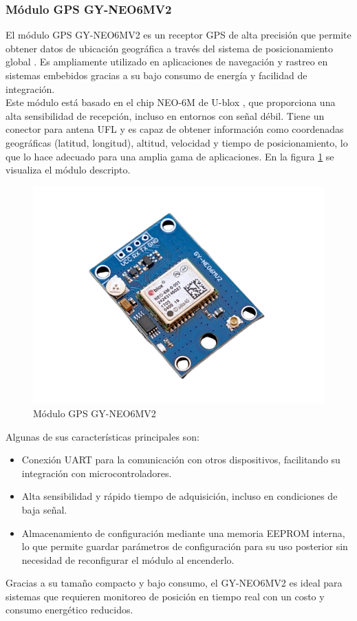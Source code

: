 \subsubsection{Módulo GPS GY-NEO6MV2}

El módulo GPS GY-NEO6MV2 es un receptor GPS de alta precisión que permite obtener datos de ubicación geográfica a través del sistema de posicionamiento global \cite{gy-neo6}. Es ampliamente utilizado en aplicaciones de navegación y rastreo en sistemas embebidos gracias a su bajo consumo de energía y facilidad de integración.\\

Este módulo está basado en el chip NEO-6M de U-blox \cite{neo6}, que proporciona una alta sensibilidad de recepción, incluso en entornos con señal débil. Tiene un conector para antena UFL y es capaz de obtener información como coordenadas geográficas (latitud, longitud), altitud, velocidad y tiempo de posicionamiento, lo que lo hace adecuado para una amplia gama de aplicaciones. En la figura \ref{fig:gps_module} se visualiza el módulo descripto. \\


\begin{figure}[H]
    \centering
    \includegraphics[scale = 0.6]{img/gps_module.png}
    \caption{Módulo GPS GY-NEO6MV2}
    \label{fig:gps_module}
\end{figure}


Algunas de sus características principales son:
\begin{itemize}
    \item Conexión UART para la comunicación con otros dispositivos, facilitando su integración con microcontroladores.
    \item Alta sensibilidad y rápido tiempo de adquisición, incluso en condiciones de baja señal.
    \item Almacenamiento de configuración mediante una memoria EEPROM interna, lo que permite guardar parámetros de configuración para su uso posterior sin necesidad de reconfigurar el módulo al encenderlo.
\end{itemize}



Gracias a su tamaño compacto y bajo consumo, el GY-NEO6MV2 es ideal para sistemas que requieren monitoreo de posición en tiempo real con un costo y consumo energético reducidos.